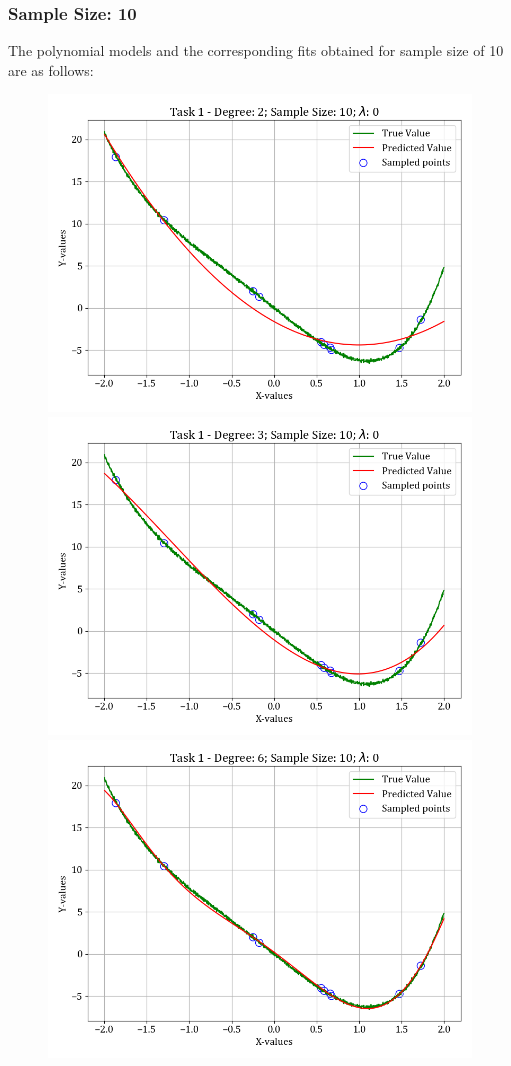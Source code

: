 \documentclass[12pt,a4paper]{article}
\begin{document}
\subsubsection{Sample Size: 10}
The polynomial models and the corresponding fits obtained for sample size of 10 are as follows:
\begin{figure}[H]
    \includegraphics[scale=0.425]{images/t1_d1/d_2_size_10_l_0.png}
    \includegraphics[scale=0.425]{images/t1_d1/d_3_size_10_l_0.png}
    \includegraphics[scale=0.425]{images/t1_d1/d_6_size_10_l_0.png}

\end{figure}
\end{document}
